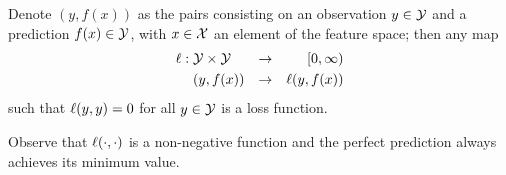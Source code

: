 \begin{definition}
    Denote $(y, f(x))$ as the pairs consisting on an observation $y \in \mathcal{Y}$ and a prediction $f(x) \in \mathcal{Y}$, with $x \in \mathcal{X}$ an element of the feature space; then any map
    \begin{equation}
        \begin{aligned}
    \nonumber
    \ell:\; &\mathcal{Y} \times \mathcal{Y} &\to &&[0, \infty) \\
    &(y, f(x)) &\to  && \ell(y, f(x)) 
\end{aligned}
\end{equation}
    such that $\ell(y, y) = 0$ for all $y \in \mathcal{Y}$ is a loss function.
\end{definition}
Observe that $\ell(\cdot, \cdot)$ is a non-negative function and the perfect prediction always achieves its minimum value.

